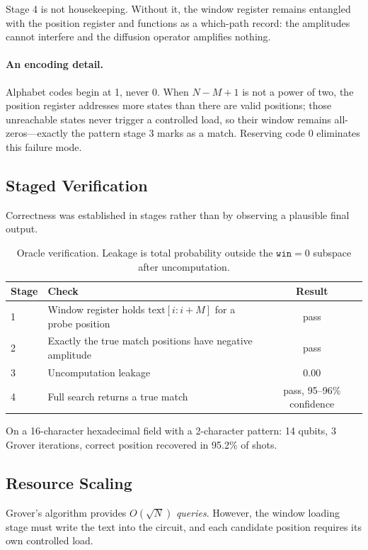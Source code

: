 \documentclass[11pt,a4paper]{article}
\begin{document}
Stage 4 is not housekeeping. Without it, the window register remains entangled
with the position register and functions as a which-path record: the amplitudes
cannot interfere and the diffusion operator amplifies nothing.

\paragraph{An encoding detail.} Alphabet codes begin at 1, never 0. When
$N-M+1$ is not a power of two, the position register addresses more states than
there are valid positions; those unreachable states never trigger a controlled
load, so their window remains all-zeros---exactly the pattern stage 3 marks as a
match. Reserving code 0 eliminates this failure mode.

\subsection{Staged Verification}

Correctness was established in stages rather than by observing a plausible final
output.

\begin{table}[h]
\centering
\caption{Oracle verification. Leakage is total probability outside the
$\texttt{win}=0$ subspace after uncomputation.}
\begin{tabular}{@{}llc@{}}
\toprule
Stage & Check & Result \\
\midrule
1 & Window register holds $\text{text}[i:i+M]$ for a probe position & pass \\
2 & Exactly the true match positions have negative amplitude & pass \\
3 & Uncomputation leakage & $\mathbf{0.00}$ \\
4 & Full search returns a true match & pass, 95--96\% confidence \\
\bottomrule
\end{tabular}
\end{table}

On a 16-character hexadecimal field with a 2-character pattern: 14 qubits, 3
Grover iterations, correct position recovered in 95.2\% of shots.

\subsection{Resource Scaling}
\label{sec:scaling}

Grover's algorithm provides $O(\sqrt{N})$ \emph{queries}. However, the window
loading stage must write the text into the circuit, and each candidate position
requires its own controlled load.
\end{document}
